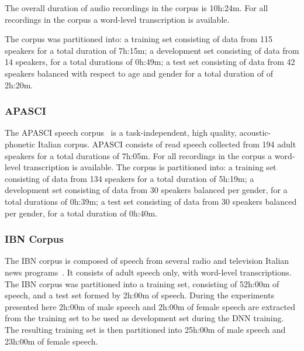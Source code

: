 \documentclass{nle}
\begin{document}
The overall  duration of audio recordings in  the corpus is
10h:24m. For  all  recordings  in  the  corpus  a
word-level   transcription   is  available.    

The corpus was partitioned into: a training set  consisting of data from 115 speakers
for a  total duration of 7h:15m;  a development set  consisting of data
from  14  speakers,  for a  total  durations  of  0h:49m; a  test  set
consisting of data  from 42 speakers balanced with  respect to age and
gender for a total duration of of 2h:20m.


\subsubsection{APASCI}
The    APASCI   speech    corpus~\citep*{AngBruFalGiuGreOmo94}    is   a
task-independent,    high     quality,    acoustic-phonetic    Italian
corpus. 
APASCI consists  of read speech collected from  194 adult  speakers for a  total durations  of 7h:05m.
For all recordings in the corpus a word-level transcription is available. 
The corpus  is partitioned  into: a training  set consisting  of data
from 134  speakers for a total  duration of 5h:19m;  a development set
consisting of data  from 30 speakers balanced per  gender, for a total
durations of  0h:39m; a test set  consisting of data  from 30 speakers
balanced per gender, for a total duration of 0h:40m.

\subsubsection{IBN Corpus}
The IBN corpus is composed of speech from several radio and television
Italian news programs~\citep{GerGiuBru09}. It consists of adult speech
only, with word-level transcriptions. The IBN corpus was  partitioned into a training set, consisting
of 52h:00m of speech, and a test set formed by 2h:00m of speech. During the experiments presented here 2h:00m of male speech and 2h:00m of female speech are extracted from the training set to be used as development set during the DNN training. The resulting training set is then partitioned into 25h:00m of male speech and 23h:00m of female speech.

\end{document}
